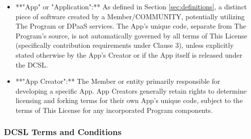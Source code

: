 \documentclass{article}
\begin{document}
\begin{itemize}
    \item **"App" or "Application":** As defined in Section \ref{sec:definitions}, a distinct piece of software created by a Member/COMMUNITY, potentially utilizing The Program or DPaaS services. The App's unique code, separate from The Program's source, is not automatically governed by all terms of This License (specifically contribution requirements under Clause 3), unless explicitly stated otherwise by the App's Creator or if the App itself is released under the DCSL.
    \item **"App Creator":** The Member or entity primarily responsible for developing a specific App. App Creators generally retain rights to determine licensing and forking terms for their own App's unique code, subject to the terms of This License for any incorporated Program components.
\end{itemize}

\subsubsection*{DCSL Terms and Conditions}
\end{document}
